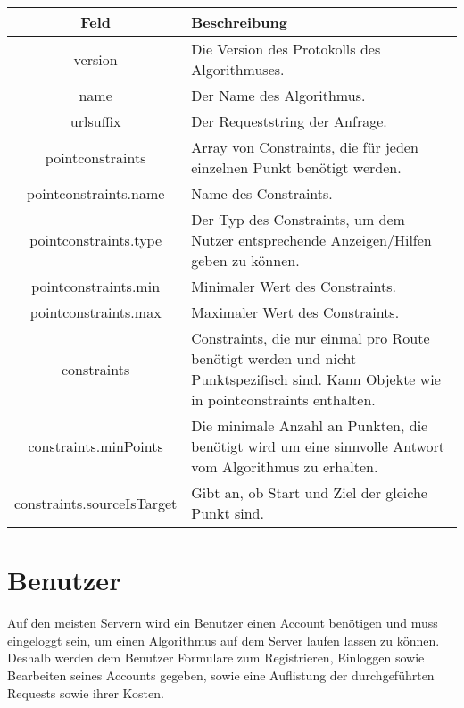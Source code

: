 \documentclass[ngerman]{scrartcl}
\begin{document}
    \noindent \begin{tabular}{|c|p{11.5cm}|}
    	\hline
    	\textbf{Feld} & \textbf{Beschreibung} \\ 
    	\hline \hline
    	
    	version & Die Version des Protokolls des Algorithmuses. \\ 
    	\hline
    	
    	name & Der Name des Algorithmus. \\
    	\hline
    	
    	urlsuffix & Der Requeststring der Anfrage. \\
    	\hline
    	
    	pointconstraints & Array von Constraints, die für jeden einzelnen Punkt benötigt werden. \\
    	\hline
    	
    	pointconstraints.name & Name des Constraints. \\
    	\hline
    	
    	pointconstraints.type & Der Typ des Constraints, um dem Nutzer entsprechende Anzeigen/Hilfen geben zu können. \\ 
    	\hline
    	
    	pointconstraints.min & Minimaler Wert des Constraints. \\
    	\hline
    	
    	pointconstraints.max & Maximaler Wert des Constraints. \\
    	\hline
    	
    	constraints & Constraints, die nur einmal pro Route benötigt werden und nicht Punktspezifisch sind. Kann Objekte wie in pointconstraints enthalten. \\
    	\hline
    	
    	constraints.minPoints & Die minimale Anzahl an Punkten, die benötigt wird um eine sinnvolle Antwort vom Algorithmus zu erhalten.\\ 
		\hline
		
		constraints.sourceIsTarget & Gibt an, ob Start und Ziel der gleiche Punkt sind.\\    		\hline    		
   	\end{tabular}
   	
\section{Benutzer}

Auf den meisten Servern wird ein Benutzer einen Account benötigen und muss eingeloggt sein, um einen Algorithmus auf dem Server laufen lassen zu können.
Deshalb werden dem Benutzer Formulare zum Registrieren, Einloggen sowie Bearbeiten seines Accounts gegeben, sowie eine Auflistung der durchgeführten Requests sowie ihrer Kosten.
\end{document}
